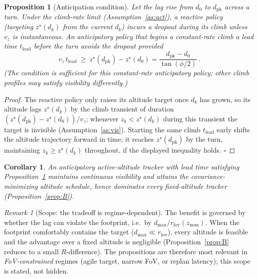 \documentclass[10pt]{article}
\newtheorem{proposition}{Proposition}
\newtheorem{corollary}{Corollary}
\theoremstyle{remark}\newtheorem{remark}{Remark}
\newcommand{\zstar}{z^{\star}}
\begin{document}
\begin{proposition}[Anticipation condition]\label{prop:C}
Let the lag rise from $d_0$ to $d_{\mathrm{pk}}$ across a turn. Under the climb-rate limit
(Assumption~\ref{as:act}), a \emph{reactive} policy (targeting $\zstar(d_k)$ from the current
$d_k$) incurs a dropout during its climb unless $v_z$ is instantaneous. An \emph{anticipatory}
policy that begins a constant-rate climb a lead time $t_{\mathrm{lead}}$ before the turn avoids
the dropout \emph{provided}
\[
\boxed{\ v_z\,t_{\mathrm{lead}}\ \ge\ \zstar(d_{\mathrm{pk}})-\zstar(d_0)
=\frac{d_{\mathrm{pk}}-d_0}{\tan(\phi/2)}\ }.
\]
(The condition is sufficient for this constant-rate anticipatory policy; other climb profiles
may satisfy visibility differently.)
\end{proposition}
\begin{proof}
The reactive policy only raises its altitude target once $d_k$ has grown, so its altitude
lags $\zstar(d_k)$ by the climb transient of duration
$(\zstar(d_{\mathrm{pk}})-\zstar(d_0))/v_z$; whenever $z_k<\zstar(d_k)$ during this transient
the target is invisible (Assumption~\ref{as:vis}). Starting the same climb $t_{\mathrm{lead}}$
early shifts the altitude trajectory forward in time; it reaches $\zstar(d_{\mathrm{pk}})$ by
the turn, maintaining $z_k\ge\zstar(d_k)$ throughout, if the displayed inequality holds. $\square$
\end{proof}

\begin{corollary}
An anticipatory active-altitude tracker with lead time satisfying Proposition~\ref{prop:C}
maintains continuous visibility and attains the covariance-minimizing altitude schedule,
hence dominates every fixed-altitude tracker (Proposition~\ref{prop:B}).
\end{corollary}

\begin{remark}[Scope: the tradeoff is regime-dependent]
The benefit is governed by whether the lag can violate the footprint, i.e.\ by
$d_{\max}/r_{\mathrm{fov}}(z_{\mathrm{nom}})$. When the footprint comfortably contains the
target ($d_{\max}\ll r_{\mathrm{fov}}$), every altitude is feasible and the advantage over a
fixed altitude is negligible (Proposition~\ref{prop:B} reduces to a small $R$-difference).
The propositions are therefore most relevant in \emph{FoV-constrained} regimes (agile target,
narrow FoV, or replan latency); this scope is stated, not hidden.
\end{remark}
\end{document}
